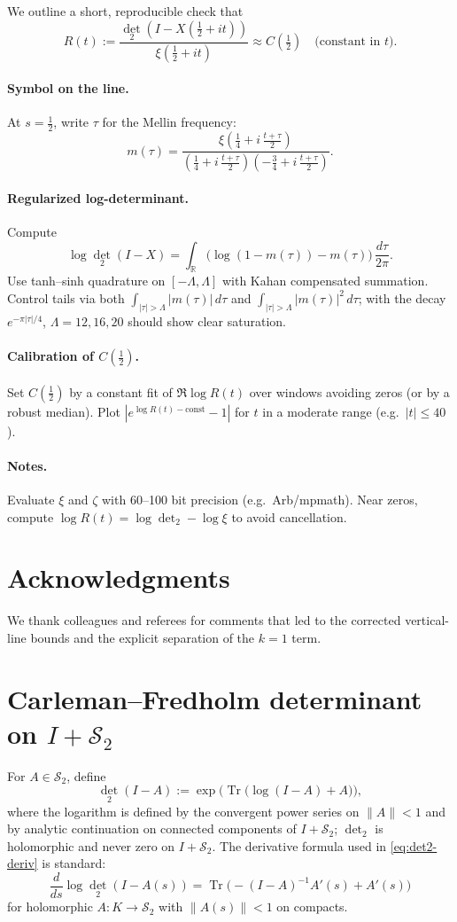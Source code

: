 \documentclass[11pt]{article}
\numberwithin{equation}{section}
\theoremstyle{definition}
\theoremstyle{remark}
\newcommand{\R}{\mathbb{R}}
\newcommand{\Hs}{\mathcal{S}_2}
\newcommand{\Tr}{\operatorname{Tr}}
\newcommand{\Dettwo}{\operatorname{det}_2}
\newcommand{\1}{\mathbbm{1}}
\begin{document}
We outline a short, reproducible check that
\[
R(t):=\frac{\Dettwo(I-X(\tfrac12+it))}{\xi(\tfrac12+it)}\approx C(\tfrac12)\quad\text{(constant in \(t\))}.
\]

\paragraph{Symbol on the line.}
At \(s=\tfrac12\), write \(\tau\) for the Mellin frequency:
\[
m(\tau)=\frac{\xi\!\left(\tfrac14+i\,\frac{t+\tau}{2}\right)}
{ \left(\tfrac14+i\,\frac{t+\tau}{2}\right)\left(-\tfrac34+i\,\frac{t+\tau}{2}\right)}.
\]

\paragraph{Regularized log-determinant.}
Compute
\[
\log \Dettwo(I-X)=\int_{\R}\big(\log(1-m(\tau)) - m(\tau)\big)\,\frac{d\tau}{2\pi}.
\]
Use tanh–sinh quadrature on \([-\Lambda,\Lambda]\) with Kahan compensated summation. Control tails via both
\(\int_{|\tau|>\Lambda}|m(\tau)|\,d\tau\) and \(\int_{|\tau|>\Lambda}|m(\tau)|^2\,d\tau\); with the decay \(e^{-\pi|\tau|/4}\), \(\Lambda=12,16,20\) should show clear saturation.

\paragraph{Calibration of \(C(\tfrac12)\).}
Set \(C(\tfrac12)\) by a constant fit of \(\Re \log R(t)\) over windows avoiding zeros (or by a robust median). Plot \(|e^{\log R(t)-\mathrm{const}}-1|\) for \(t\) in a moderate range (e.g.\ \(|t|\le 40\)).

\paragraph{Notes.}
Evaluate \(\xi\) and \(\zeta\) with 60–100 bit precision (e.g.\ Arb/mpmath). Near zeros, compute \(\log R(t)=\log\Dettwo - \log\xi\) to avoid cancellation.

\section*{Acknowledgments}
We thank colleagues and referees for comments that led to the corrected vertical-line bounds and the explicit separation of the \(k=1\) term.

\appendix

\section{Carleman--Fredholm determinant on \texorpdfstring{$I+\Hs$}{I+S2}}
For \(A\in\Hs\), define
\[
\Dettwo(I-A):=\exp\Big(\Tr\big(\log(I-A)+A\big)\Big),
\]
where the logarithm is defined by the convergent power series on \(\|A\|<1\) and by analytic continuation on connected components of \(I+\Hs\); \(\Dettwo\) is holomorphic and never zero on \(I+\Hs\). The derivative formula used in \eqref{eq:det2-deriv} is standard:
\[
\frac{d}{ds}\log \Dettwo(I-A(s))=\Tr\!\big(-(I-A)^{-1}A'(s)+A'(s)\big)
\]
for holomorphic \(A:K\to\Hs\) with \(\|A(s)\|<1\) on compacts.
\end{document}
